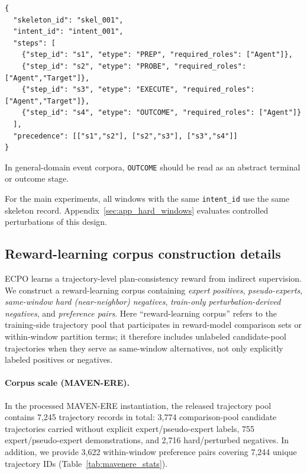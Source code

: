 \documentclass{article}
\begin{document}
\begin{lstlisting}[caption={Skeleton record format (schematic JSONL).},label={lst:skeleton_record}]
{
  "skeleton_id": "skel_001",
  "intent_id": "intent_001",
  "steps": [
    {"step_id": "s1", "etype": "PREP", "required_roles": ["Agent"]},
    {"step_id": "s2", "etype": "PROBE", "required_roles": ["Agent","Target"]},
    {"step_id": "s3", "etype": "EXECUTE", "required_roles": ["Agent","Target"]},
    {"step_id": "s4", "etype": "OUTCOME", "required_roles": ["Agent"]}
  ],
  "precedence": [["s1","s2"], ["s2","s3"], ["s3","s4"]]
}
\end{lstlisting}

In general-domain event corpora, \texttt{OUTCOME} should be read as an abstract terminal or outcome stage.

For the main experiments, all windows with the same \texttt{intent\_id} use the same skeleton record.
Appendix~\ref{sec:app_hard_windows} evaluates controlled perturbations of this design.

\subsection{Reward-learning corpus construction details}
\label{sec:app_irl_corpus}

ECPO learns a trajectory-level plan-consistency reward from indirect supervision.
We construct a reward-learning corpus containing \emph{expert positives}, \emph{pseudo-experts}, \emph{same-window hard (near-neighbor) negatives}, \emph{train-only perturbation-derived negatives}, and \emph{preference pairs}.
Here ``reward-learning corpus'' refers to the training-side trajectory pool that participates in reward-model comparison sets or within-window partition terms; it therefore includes unlabeled candidate-pool trajectories when they serve as same-window alternatives, not only explicitly labeled positives or negatives.

\paragraph{Corpus scale (MAVEN-ERE).}
In the processed MAVEN-ERE instantiation, the released trajectory pool contains 7,245 trajectory records in total:
3,774 comparison-pool candidate trajectories carried without explicit expert/pseudo-expert labels,
755 expert/pseudo-expert demonstrations, and
2,716 hard/perturbed negatives.
In addition, we provide 3,622 within-window preference pairs covering 7,244 unique trajectory IDs (Table~\ref{tab:mavenere_stats}).
\end{document}
